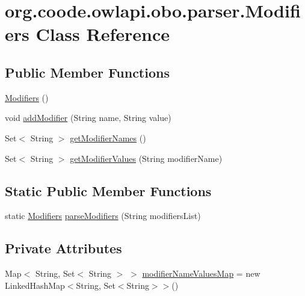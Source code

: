 \hypertarget{classorg_1_1coode_1_1owlapi_1_1obo_1_1parser_1_1_modifiers}{\section{org.\-coode.\-owlapi.\-obo.\-parser.\-Modifiers Class Reference}
\label{classorg_1_1coode_1_1owlapi_1_1obo_1_1parser_1_1_modifiers}
}
\subsection*{Public Member Functions}
\begin{DoxyCompactItemize}
\item 
\hyperlink{classorg_1_1coode_1_1owlapi_1_1obo_1_1parser_1_1_modifiers_a576bfd1d6205813c35184519dce43e64}{Modifiers} ()
\item 
void \hyperlink{classorg_1_1coode_1_1owlapi_1_1obo_1_1parser_1_1_modifiers_af9ca3508599af03712474924c478bec0}{add\-Modifier} (String name, String value)
\item 
Set$<$ String $>$ \hyperlink{classorg_1_1coode_1_1owlapi_1_1obo_1_1parser_1_1_modifiers_a73f2f3c843fb649d4fa66cb6f823dde7}{get\-Modifier\-Names} ()
\item 
Set$<$ String $>$ \hyperlink{classorg_1_1coode_1_1owlapi_1_1obo_1_1parser_1_1_modifiers_a82bee47d5ed62d4246107bd5d084c398}{get\-Modifier\-Values} (String modifier\-Name)
\end{DoxyCompactItemize}
\subsection*{Static Public Member Functions}
\begin{DoxyCompactItemize}
\item 
static \hyperlink{classorg_1_1coode_1_1owlapi_1_1obo_1_1parser_1_1_modifiers}{Modifiers} \hyperlink{classorg_1_1coode_1_1owlapi_1_1obo_1_1parser_1_1_modifiers_acf7c41c4538e7a863cce93c3ec918678}{parse\-Modifiers} (String modifiers\-List)
\end{DoxyCompactItemize}
\subsection*{Private Attributes}
\begin{DoxyCompactItemize}
\item 
Map$<$ String, Set$<$ String $>$ $>$ \hyperlink{classorg_1_1coode_1_1owlapi_1_1obo_1_1parser_1_1_modifiers_a9efaddeac98bca8ede138655ee75043b}{modifier\-Name\-Values\-Map} = new Linked\-Hash\-Map$<$String, Set$<$String$>$$>$()
\end{DoxyCompactItemize}


